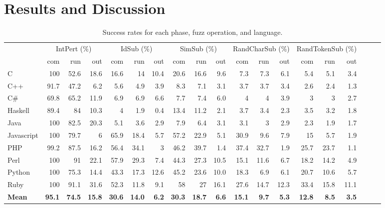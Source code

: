 \documentclass[10pt]{sigplanconf}
\begin{document}
\section{Results and Discussion} %
\label{sec:results}

\begin{table}
\begin{center}
\begin{tabular}{ l r r r r r r r r r r r r r r r r r r }
& \multicolumn{3}{c}{IntPert (\%)} & \multicolumn{3}{c}{IdSub (\%)} & \multicolumn{3}{c}{SimSub (\%)} & \multicolumn{3}{c}{RandCharSub (\%)} & \multicolumn{3}{c}{RandTokenSub (\%)}\\ 
	       & com  & run  & out  & com  & run  & out  & com  & run  & out  & com & run   & out  & com  & run  & out\\
\hline															
C          & 100  & 52.6 & 18.6 & 16.6 & 14   & 10.4 & 20.6	& 16.6 & 9.6  &	7.3	 & 7.3  & 6.1  & 5.4  & 5.1  & 3.4\\
C++        & 91.7 &	47.2 & 6.2  & 5.6  & 4.9  & 3.9	 & 8.3	& 7.1  & 3.1  & 3.7	 & 3.7  & 3.4  & 2.6  & 2.4  & 1.3\\
C\#        & 69.8 & 65.2 & 11.9 & 6.9  & 6.9  & 6.6	 & 7.7	& 7.4  & 6.0  & 4	 & 4    & 3.9  & 3    & 3    & 2.7\\
Haskell    & 89.4 & 84   & 10.3 & 4    & 1.9  & 0.4	 & 13.4	& 11.2 & 2.1  & 3.7	 & 3.4  & 2.3  & 3.5  & 3.2  & 1.8\\
Java       & 100  & 82.5 & 20.3 & 5.1  & 3.6  & 2.9	 & 7.9	& 6.4  & 3.1  & 3.1	 & 3    & 2.9  & 2.3  & 1.9  & 1.7\\
Javascript & 100  & 79.7 & 6    & 65.9 & 18.4 & 5.7	 & 57.2	& 22.9 & 5.1  & 30.9 & 9.6  & 7.9  & 15   & 5.7  & 1.9\\
PHP        & 99.2 & 87.5 & 16.2 & 56.4 & 34.1 & 3	 & 46.2	& 39.7 & 1.4  & 37.4 & 32.7 & 1.9  & 25.7 & 23.7 & 1.1\\
Perl       & 100  & 91   & 22.1 & 57.9 & 29.3 & 7.4	 & 44.3	& 27.3 & 10.5 & 15.1 & 11.6	& 6.7  & 18.2 & 14.2 & 4.9\\
Python     & 100  & 75.3 & 14.4 & 43.3 & 17.3 & 12.6 & 45.2	& 23.6 & 10.0 & 18.3 & 6.9	& 6.1  & 20.7 & 10.6 & 5.7\\
Ruby       & 100  & 91.1 & 31.6 & 52.3 & 11.8 & 9.1	 & 58	& 27   & 16.1 & 27.6 & 14.7	& 12.3 & 33.4 & 15.8 & 11.1\\
\hline															
\textbf{Mean} & \textbf{95.1} & \textbf{74.5} & \textbf{15.8} & \textbf{30.6} & \textbf{14.0} & \textbf{6.2} & \textbf{30.3} & \textbf{18.7} & \textbf{6.6} & \textbf{15.1} & \textbf{9.7} & \textbf{5.3} & \textbf{12.8} & \textbf{8.5} & \textbf{3.5}\\
\end{tabular}
\end{center}
\caption{Success rates for each phase, fuzz operation, and language.}
\label{tbl:aggregated-per-language}
\end{table}
\end{document}
